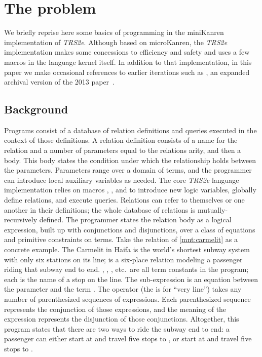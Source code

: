 \documentclass[runningheads,natbib=false]{llncs}
\begin{document}
\section{The problem}\label{sec:all-aboard}

We briefly reprise here some basics of programming in the miniKanren
implementation of \emph{TRS2e}. Although based on microKanren, the
\emph{TRS2e} implementation makes some concessions to efficiency and
safety and uses a few macros in the language kernel itself. In
addition to that implementation, in this paper we make occasional
references to earlier iterations such as
\citet{hemann2016small}, an expanded
archival version of the 2013 paper~\cite{hemann2013muKanren}.

\subsection{Background}

Programs consist of a database of relation definitions and queries
executed in the context of those definitions. A relation definition
consists of a name for the relation and a number of parameters equal
to the relations arity, and then a body. This body states the
condition under which the relationship holds between the parameters.
Parameters range over a domain of terms, and the programmer can
introduce local auxiliary variables as needed. The core \emph{TRS2e}
language implementation relies on macros ,
, and  to introduce new logic
variables, globally define relations, and execute queries. Relations
can refer to themselves or one another in their definitions; the whole
database of relations is mutually-recursively defined. The programmer
states the relation body as a logical expression, built up with
conjunctions and disjunctions, over a class of equations and primitive
constraints on terms. Take the  relation
of \cref{mnt:carmelit} as a concrete example. The Carmelit in Haifa is
the world's shortest subway system with only six stations on its line;
 is a six-place relation modeling a
passenger riding that subway end to end. \@
{}, , ,
etc.\ are all term constants in the program; each is the name of a
stop on the line. The sub-expression
 is an equation between the
parameter  and the term . The
 operator (the  is for
\enquote{very line}) takes any number of parenthesized
sequences of expressions. Each parenthesized sequence represents the
conjunction of those expressions, and the meaning of the
 expression represents the disjunction of those
conjunctions. Altogether, this program states that there are two ways
to ride the subway end to end: a passenger can either start at
 and travel five stops to
, or start at  and travel
five stops to .
\end{document}
